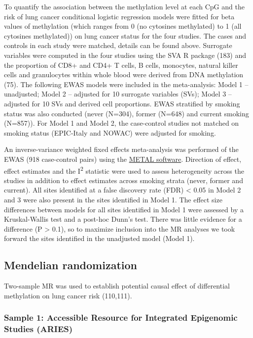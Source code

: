 \documentclass[11pt,oneside]{bristolthesis}
\begin{document}
To quantify the association between the methylation level at each CpG and the risk of lung cancer conditional logistic regression models were fitted for beta values of methylation (which ranges from 0 (no cytosines methylated) to 1 (all cytosines methylated)) on lung cancer status for the four studies. The cases and controls in each study were matched, details can be found above. Surrogate variables were computed in the four studies using the SVA R package (183) and the proportion of CD8+ and CD4+ T cells, B cells, monocytes, natural killer cells and granulocytes within whole blood were derived from DNA methylation (75). The following EWAS models were included in the meta-analysis: Model 1 -- unadjusted; Model 2 -- adjusted for 10 surrogate variables (SVs); Model 3 -- adjusted for 10 SVs and derived cell proportions. EWAS stratified by smoking status was also conducted (never (N=304), former (N=648) and current smoking (N=857)). For Model 1 and Model 2, the case-control studies not matched on smoking status (EPIC-Italy and NOWAC) were adjusted for smoking.

An inverse-variance weighted fixed effects meta-analysis was performed of the EWAS (918 case-control pairs) using the \href{http://csg.sph.umich.edu/abecasis/metal/}{METAL software}. Direction of effect, effect estimates and the I\textsuperscript{2} statistic were used to assess heterogeneity across the studies in addition to effect estimates across smoking strata (never, former and current). All sites identified at a false discovery rate (FDR) \textless{} 0.05 in Model 2 and 3 were also present in the sites identified in Model 1. The effect size differences between models for all sites identified in Model 1 were assessed by a Kruskal-Wallis test and a post-hoc Dunn's test. There was little evidence for a difference (P \textgreater{} 0.1), so to maximize inclusion into the MR analyses we took forward the sites identified in the unadjusted model (Model 1).

\hypertarget{methods-mendelian-randomization-07}{%
\subsection{Mendelian randomization}\label{methods-mendelian-randomization-07}}

Two-sample MR was used to establish potential causal effect of differential methylation on lung cancer risk (110,111).

\hypertarget{sample-1-accessible-resource-for-integrated-epigenomic-studies-aries}{%
\subsubsection{Sample 1: Accessible Resource for Integrated Epigenomic Studies (ARIES)}\label{sample-1-accessible-resource-for-integrated-epigenomic-studies-aries}}
\end{document}
